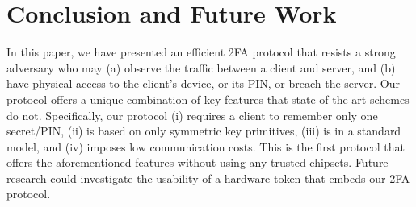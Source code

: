 

\vspace{-4mm}
\section{Conclusion and Future Work}

\vspace{-2mm}

In this paper, we have presented an efficient 2FA protocol that resists a strong adversary who may (a) observe the traffic between a client and server, and (b) have physical access to the client’s device, or its PIN, or breach the server. Our protocol offers a unique combination of key features that state-of-the-art schemes do not. Specifically,  our protocol (i) requires a client to remember only one secret/PIN, (ii) is based on only symmetric key primitives, (iii) is in a standard model, and (iv) imposes low communication costs. This is the first protocol that offers the aforementioned features without using any trusted chipsets. Future research could investigate the usability of a hardware token that embeds our 2FA protocol. 

